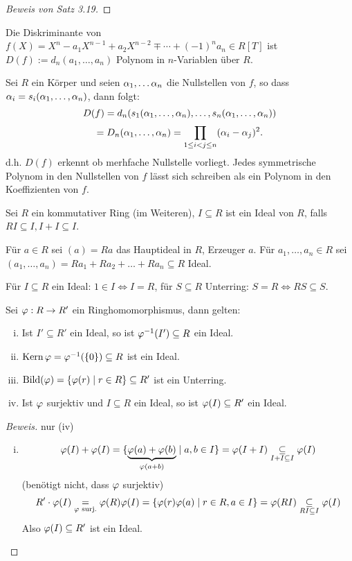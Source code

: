 \documentclass[a4paper]{report}
\begin{document}
\begin{proof}[Beweis von Satz 3.19] %

\end{proof}
\begin{defi}
Die Diskriminante von $f(X) = X^{n} - a_{1}X^{n-1} + a_{2}X^{n-2} \mp \cdots + (-1)^{n}a_{n} \in R[T]$ ist $D(f):= d_{n}(a_{1}, \ldots, a_{n})$ Polynom in $n$-Variablen über $R$.
\end{defi}
\begin{bed*}
  Sei $R$ ein Körper und seien $\alpha_{1}, \ldots \alpha_{n}$ die Nullstellen von $f$, so dass $\alpha_{i} = s_{i}(\alpha_{1}, \ldots, \alpha_{n})$, dann folgt:
  \[D(f) = d_{n}(s_{1}(\alpha_{1}, \ldots, \alpha_{n}), \ldots, s_{n}(\alpha_{1}, \ldots, \alpha_{n}))\]
  \[= D_{n}(\alpha_{1}, \ldots, \alpha_{n}) = \prod_{1 \le i < j \le n}(\alpha_{i} - \alpha_{j})^{2}.\]
  d.h. $D(f)$ erkennt ob merhfache Nullstelle vorliegt. Jedes symmetrische Polynom in den Nullstellen von $f$ lässt sich schreiben als ein Polynom in den Koeffizienten von $f$.
\end{bed*}
\begin{whg}
  Sei $R$ ein kommutativer Ring (im Weiteren), $I \subseteq R$ ist ein Ideal von $R$, falls $RI \subseteq I, I+I \subseteq I$.
\end{whg}
\begin{nota*}
  Für $a \in R$ sei $(a) = Ra$ das Hauptideal in $R$, Erzeuger $a$. Für $a_{1}, \ldots, a_{n} \in R$ sei $(a_{1}, \ldots, a_{n}) = Ra_{1} + R{a_{2}} + \ldots + Ra_{n} \subseteq R$ Ideal.
\end{nota*}
\begin{bem*}[Übung]
Für $ I \subseteq R$ ein Ideal: $1 \in I \iff I = R$, für $S \subseteq R$ Unterring: $S = R \iff RS \subseteq S$.
\end{bem*}


\begin{prop}
  Sei $\varphi: R \to R'$ ein Ringhomomorphismus, dann gelten:
  \begin{enumerate}[(i)]
    \item Ist $I' \subseteq R'$ ein Ideal, so ist $\varphi^{-1}(I') \subseteq R$ ein Ideal.
    \item $\operatorname{Kern} \varphi = \varphi^{-1}(\{0\}) \subseteq R$ ist ein Ideal.
    \item $\operatorname{Bild}(\varphi) = \{\varphi(r) \mid r \in R\} \subseteq R'$ ist ein Unterring.
    \item Ist $\varphi$ surjektiv und $I \subseteq R$ ein Ideal, so ist $\varphi(I) \subseteq R'$ ein Ideal.
  \end{enumerate}
  \begin{proof}[Beweis] nur (iv)
    \begin{enumerate}[(iv)]
      \item \[\varphi(I) + \varphi(I) = \{\underbrace{\varphi(a) + \varphi(b)}_{\varphi(a+b)} \mid a, b \in I\} = \varphi(I + I) \underset{I + I \subseteq I} \subseteq \varphi(I)\]
            (benötigt nicht, dass $\varphi$ surjektiv)
            \[R' \cdot \varphi(I) \underset{\varphi \text{ surj.}} = \varphi(R)\varphi(I) = \{\varphi(r)\varphi(a) \mid r \in R, a \in I\} = \varphi(RI) \underset{RI \subseteq I} \subseteq \varphi(I)\]
            Also $\varphi(I) \subseteq R'$ ist ein Ideal.\qedhere
    \end{enumerate}
  \end{proof}
\end{prop}
\end{document}
